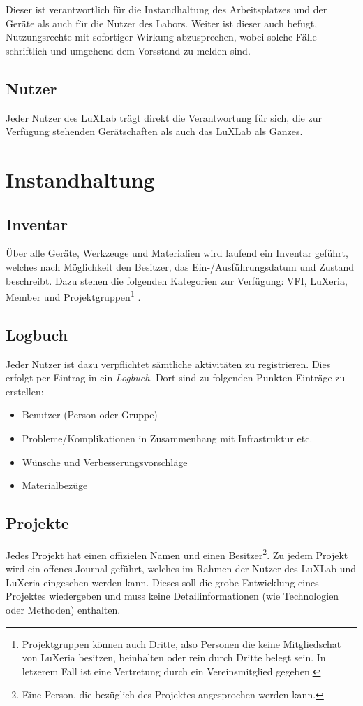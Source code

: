 \documentclass[a4paper,
               10pt,
               fleqn]{article}
\begin{document}
Dieser ist verantwortlich für die Instandhaltung des Arbeitsplatzes und der 
Geräte als auch für die Nutzer des Labors. Weiter ist dieser auch befugt, 
Nutzungsrechte mit sofortiger Wirkung abzusprechen, wobei solche
Fälle schriftlich und umgehend dem Vorsstand zu melden sind.

\subsection{Nutzer}
Jeder Nutzer des LuXLab trägt direkt die Verantwortung für sich,
die zur Verfügung stehenden Gerätschaften als auch das LuXLab als Ganzes.

\section{Instandhaltung}

\subsection{Inventar}
Über alle Geräte, Werkzeuge und Materialien wird laufend ein Inventar 
geführt, welches nach Möglichkeit den Besitzer, das Ein-/Ausführungsdatum 
und Zustand beschreibt. 
Dazu stehen die folgenden Kategorien zur Verfügung: VFI, LuXeria, Member und
Projektgruppen\footnote{
    Projektgruppen können auch Dritte, also Personen die keine Mitgliedschat
    von LuXeria besitzen, beinhalten oder rein durch Dritte belegt sein. 
    In letzerem Fall ist eine Vertretung durch ein Vereinsmitglied gegeben.}
.

\subsection{Logbuch}
Jeder Nutzer ist dazu verpflichtet sämtliche aktivitäten zu registrieren.
Dies erfolgt per Eintrag in ein \emph{Logbuch}. Dort sind zu folgenden
Punkten Einträge zu erstellen:
\begin{itemize}
    \item Benutzer (Person oder Gruppe)
    \item Probleme/Komplikationen in Zusammenhang mit Infrastruktur etc.
    \item Wünsche und Verbesserungsvorschläge
    \item Materialbezüge
\end{itemize}

\subsection{Projekte}
Jedes Projekt hat einen offizielen Namen und einen Besitzer\footnote{
    Eine Person, die bezüglich des Projektes angesprochen werden kann.}.
Zu jedem Projekt wird ein offenes Journal geführt, welches im Rahmen der
Nutzer des LuXLab und LuXeria eingesehen werden kann. 
Dieses soll die grobe Entwicklung
eines Projektes wiedergeben und muss keine Detailinformationen 
(wie Technologien oder Methoden) enthalten. 
\end{document}
